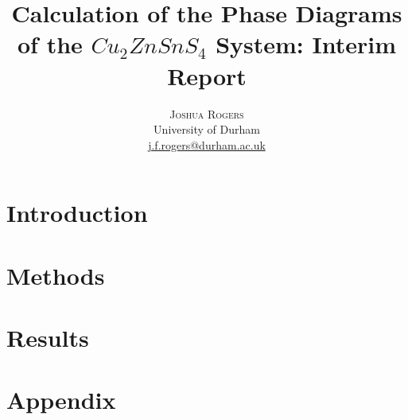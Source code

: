 \documentclass[11pt,a4paper,twoside]{article}
\title{\vspace{-15mm}\fontsize{24pt}{10pt}\selectfont\textbf{Calculation of the Phase Diagrams of the $Cu_2ZnSnS_4$ System: Interim Report}} %
\author{
\large
\textsc{Joshua Rogers}\\[2mm] %
\normalsize University of Durham \\ %
\normalsize \href{mailto:j.f.rogers@durham.ac.uk}{j.f.rogers@durham.ac.uk} %
\vspace{-5mm}
}
\date{}
\begin{document}
\maketitle %

\thispagestyle{fancy} %


\begin{abstract}

\noindent 

\end{abstract}



\section{Introduction}

\clearpage
\section{Methods}



\clearpage
\section{Results}



\clearpage
\section{Appendix}


\clearpage



\clearpage





\end{document}
